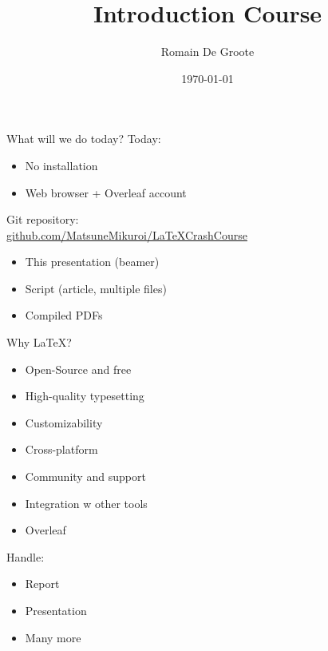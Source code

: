 \documentclass[show notes on second screen=right]{beamer}
\title{Introduction Course}
\author{Romain De Groote}
\date{\today}
\begin{document}
\titlepage  %

\begin{frame}[t]{What will we do today?}  %
  \onslide<+->
  Today:
  \begin{itemize}
    \item No installation
    \item Web browser + Overleaf account
  \end{itemize}
  \onslide<+->
  Git repository:\\
  \href{https://github.com/MatsuneMikuroi/LaTeXCrashCourse}{github.com/MatsuneMikuroi/LaTeXCrashCourse}
  \begin{itemize}
    \item This presentation (beamer)
    \item Script (article, multiple files)
    \item Compiled PDFs
  \end{itemize}
\end{frame}

\begin{frame}[t]{Why LaTeX?}  %
  \onslide<+->  %
  \begin{itemize}
    \item Open-Source and free
    \item High-quality typesetting
    \item Customizability
    \item Cross-platform
    \item Community and support
    \item Integration w other tools
    \item Overleaf
  \end{itemize}
  \onslide<+->
  Handle:
  \begin{itemize}
    \item Report
    \item Presentation
    \item Many more
  \end{itemize}
\end{frame}
\end{document}
